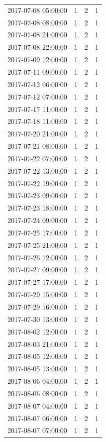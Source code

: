 \begin{tabular}{lrrr}
2017-07-08 05:00:00 & 1 & 2 & 1 \\
2017-07-08 08:00:00 & 1 & 2 & 1 \\
2017-07-08 21:00:00 & 1 & 2 & 1 \\
2017-07-08 22:00:00 & 1 & 2 & 1 \\
2017-07-09 12:00:00 & 1 & 2 & 1 \\
2017-07-11 09:00:00 & 1 & 2 & 1 \\
2017-07-12 06:00:00 & 1 & 2 & 1 \\
2017-07-12 07:00:00 & 1 & 2 & 1 \\
2017-07-17 11:00:00 & 1 & 2 & 1 \\
2017-07-18 11:00:00 & 1 & 2 & 1 \\
2017-07-20 21:00:00 & 1 & 2 & 1 \\
2017-07-21 08:00:00 & 1 & 2 & 1 \\
2017-07-22 07:00:00 & 1 & 2 & 1 \\
2017-07-22 13:00:00 & 1 & 2 & 1 \\
2017-07-22 19:00:00 & 1 & 2 & 1 \\
2017-07-23 09:00:00 & 1 & 2 & 1 \\
2017-07-23 18:00:00 & 1 & 2 & 1 \\
2017-07-24 09:00:00 & 1 & 2 & 1 \\
2017-07-25 17:00:00 & 1 & 2 & 1 \\
2017-07-25 21:00:00 & 1 & 2 & 1 \\
2017-07-26 12:00:00 & 1 & 2 & 1 \\
2017-07-27 09:00:00 & 1 & 2 & 1 \\
2017-07-27 17:00:00 & 1 & 2 & 1 \\
2017-07-29 15:00:00 & 1 & 2 & 1 \\
2017-07-29 16:00:00 & 1 & 2 & 1 \\
2017-07-30 13:00:00 & 1 & 2 & 1 \\
2017-08-02 12:00:00 & 1 & 2 & 1 \\
2017-08-03 21:00:00 & 1 & 2 & 1 \\
2017-08-05 12:00:00 & 1 & 2 & 1 \\
2017-08-05 13:00:00 & 1 & 2 & 1 \\
2017-08-06 04:00:00 & 1 & 2 & 1 \\
2017-08-06 08:00:00 & 1 & 2 & 1 \\
2017-08-07 04:00:00 & 1 & 2 & 1 \\
2017-08-07 06:00:00 & 1 & 2 & 1 \\
2017-08-07 07:00:00 & 1 & 2 & 1 \\

\end{tabular}
